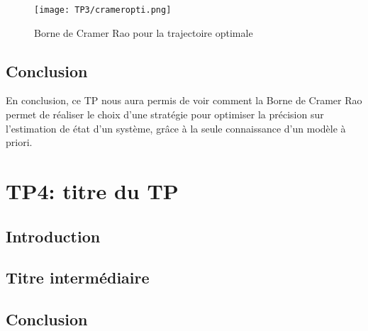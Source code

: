 \documentclass{article}
\begin{document}
\begin{figure}
  \centering
  \texttt{[image: TP3/crameropti.png]}
  \label{crameropti}
  \caption{Borne de Cramer Rao pour la trajectoire optimale}
\end{figure}

\subsection{Conclusion}
En conclusion, ce TP nous aura permis de voir comment la Borne de Cramer Rao permet de réaliser le choix d'une stratégie pour 
optimiser la précision sur l'estimation de état d'un système, grâce à la seule connaissance d'un modèle à priori.

\newpage

\section{TP4: titre du TP}
\subsection{Introduction}

\subsection{Titre intermédiaire}

\subsection{Conclusion}

\newpage


\end{document}
